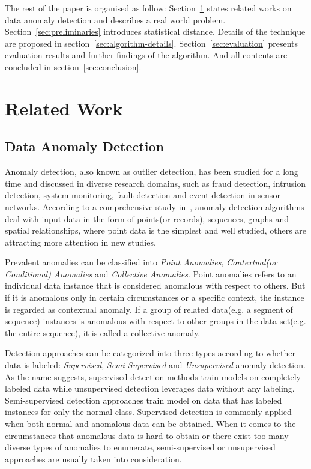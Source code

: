 \documentclass[a4paper]{IEEEtran}
\begin{document}
		The rest of the paper is organised as follow: Section~\ref{sec:related-work} states related works on data anomaly detection and describes a real world problem. Section~\ref{sec:preliminaries} introduces statistical distance. Details of the technique are proposed in section~\ref{sec:algorithm-details}. Section~\ref{sec:evaluation} presents evaluation results and further findings of the algorithm. And all contents are concluded in section~\ref{sec:conclusion}.
	
	\section{Related Work}\label{sec:related-work}
		\subsection{Data Anomaly Detection}
			Anomaly detection, also known as outlier detection, has been studied for a long time and discussed in diverse research domains, such as fraud detection, intrusion detection, system monitoring, fault detection and event detection in sensor networks. According to a comprehensive study in~\cite{chandola2009anomaly}, anomaly detection algorithms deal with input data in the form of points(or records), sequences, graphs and spatial relationships, where point data is the simplest and well studied, others are attracting more attention in new studies.
			
			Prevalent anomalies can be classified into \textit{Point Anomalies}, \textit{Contextual(or Conditional) Anomalies} and \textit{Collective Anomalies}. Point anomalies refers to an individual data instance that is considered anomalous with respect to others. But if it is anomalous only in certain circumstances or a specific context, the instance is regarded as contextual anomaly. If a group of related data(e.g. a segment of sequence) instances is anomalous with respect to other groups in the data set(e.g. the entire sequence), it is called a collective anomaly.
			
			Detection approaches can be categorized into three types according to whether data is labeled: \textit{Supervised}, \textit{Semi-Supervised} and \textit{Unsupervised} anomaly detection. As the name suggests, supervised detection methods train models on completely labeled data while unsupervised detection leverages data without any labeling. Semi-supervised detection approaches train model on data that has labeled instances for only the normal class. Supervised detection is commonly applied when both normal and anomalous data can be obtained. When it comes to the circumstances that anomalous data is hard to obtain or there exist too many diverse types of anomalies to enumerate, semi-supervised or unsupervised approaches are usually taken into consideration.
			
\end{document}
